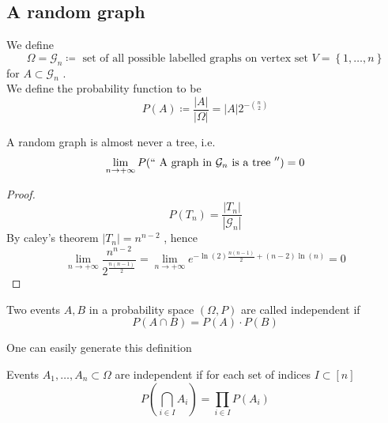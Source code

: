 \documentclass[../main.tex]{subfiles}
\begin{document}
\subsection{A random graph}
We define 
\[ 
\Omega= \mathcal{G}_n \coloneqq \text{ set of all possible labelled graphs on vertex set  } V = \left\{ 1, \ldots, n \right\} 
\]
for $A \subset \mathcal{G}_n$ .\\
We define the probability function to be
\[ 
	P( A)  \coloneqq \frac{|A|}{|\Omega|}= |A| 2^{- \binom n 2}
\]
\begin{propo}
A random graph is almost never a tree, i.e.
\[ 
	\lim_{n \to  + \infty} P( `` \text{ A graph in $\mathcal{G}_n$ is a tree } '' ) =0
\]

\end{propo}
\begin{proof}
\[ 
	P( T_n) = \frac{|T_n|}{| \mathcal{G}_n|}
\]
By caley's theorem $|T_n| = n^{n-2}$ , hence
\[ 
	\lim_{n \to  + \infty} \frac{n^{n-2}}{2^{ \frac{n ( n-1) }{2}}}= \lim_{n \to  + \infty} e^{- \ln( 2) \frac{n( n-1) }{2}+ ( n-2) \ln ( n) } =0
\]

\end{proof}
\begin{defn}
	Two events $A,B$ in a  probability space $(  \Omega, P) $ are called independent if
	\[ 
		P( A \cap B) = P( A) \cdot P( B) 
	\]
	
\end{defn}
One can easily generate this definition
\begin{defn}
	Events $A_1, \ldots, A_n \subset \Omega	$ are independent if for each set of indices $I \subset [ n] $ 
	\[ 
		P( \bigcap_{i \in I} A_i) = \prod_{i\in I} P( A_i) 		
	\]
	
	
\end{defn}
\end{document}
